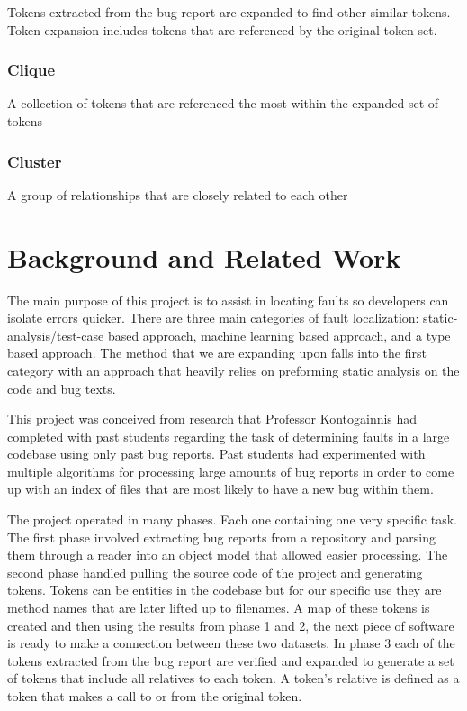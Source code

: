 \documentclass[12pt]{article}
\begin{document}
Tokens extracted from the bug report are expanded to find other similar
tokens. Token expansion includes tokens that are referenced by the
original token set.

\hypertarget{clique}{%
\subsubsection{Clique}\label{clique}}

A collection of tokens that are referenced the most within the expanded
set of tokens

\hypertarget{cluster}{%
\subsubsection{Cluster}\label{cluster}}

A group of relationships that are closely related to each other

\hypertarget{background-and-related-work}{%
\section{Background and Related
Work}\label{background-and-related-work}}

The main purpose of this project is to assist in locating faults so
developers can isolate errors quicker. There are three main categories
of fault localization: static-analysis/test-case based approach, machine
learning based approach, and a type based approach. The method that we
are expanding upon falls into the first category with an approach that
heavily relies on preforming static analysis on the code and bug texts.

This project was conceived from research that Professor Kontogainnis had
completed with past students regarding the task of determining faults in
a large codebase using only past bug reports. Past students had
experimented with multiple algorithms for processing large amounts of
bug reports in order to come up with an index of files that are most
likely to have a new bug within them.

The project operated in many phases. Each one containing one very
specific task. The first phase involved extracting bug reports from a
repository and parsing them through a reader into an object model that
allowed easier processing. The second phase handled pulling the source
code of the project and generating tokens. Tokens can be entities in the
codebase but for our specific use they are method names that are later
lifted up to filenames. A map of these tokens is created and then using
the results from phase 1 and 2, the next piece of software is ready to
make a connection between these two datasets. In phase 3 each of the
tokens extracted from the bug report are verified and expanded to
generate a set of tokens that include all relatives to each token. A
token's relative is defined as a token that makes a call to or from the
original token.
\end{document}
